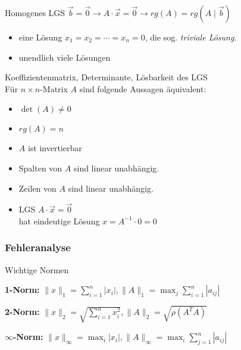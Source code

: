     \begin{definition}{Homogenes LGS}
        $\vec{b}=\vec{0} \rightarrow A\cdot\vec{x}=\vec{0} \rightarrow rg(A)=rg(A\mid\vec{b})$
            \begin{itemize}
                \item eine Lösung $x_1=x_2=\cdots=x_n=0$, die sog. \textit{triviale Lösung}.
                \item unendlich viele Lösungen
            \end{itemize}
    \end{definition}

    \begin{theorem}{Koeffizientenmatrix{,} Determinante{,} Lösbarkeit des LGS }\\
        Für $n\times n$-Matrix $A$ sind folgende Aussagen äquivalent:
    
        \vspace{1mm}
    
        \begin{minipage}{0.3\linewidth}
            \begin{itemize}
                \item $\det(A)\neq 0$
                \item $rg(A)=n$
                \item $A$ ist invertierbar
            \end{itemize}
        \end{minipage}
        \begin{minipage}{0.7\linewidth}
            \begin{itemize}
                \item Spalten von $A$ sind linear unabhängig.
                \item Zeilen von $A$ sind linear unabhängig.
                \item LGS $A\cdot\vec{x}=\vec{0}$ \\hat eindeutige Lösung $x=A^{-1}\cdot 0=0$
            \end{itemize}
        \end{minipage}
    \end{theorem}

    




\subsubsection{Fehleranalyse}

\begin{concept}{Wichtige Normen}

\textbf{1-Norm:}
        $\|x\|_1 = \sum_{i=1}^n |x_i|,
        \|A\|_1 = \max_j \sum_{i=1}^n |a_{ij}|$

\textbf{2-Norm:}
        $\|x\|_2 = \sqrt{\sum_{i=1}^n x_i^2}, 
        \|A\|_2 = \sqrt{\rho(A^TA)}$

$\infty$\textbf{-Norm:}
        $\|x\|_\infty = \max_i |x_i|, 
        \|A\|_\infty = \max_i \sum_{j=1}^n |a_{ij}|$
\end{concept}

